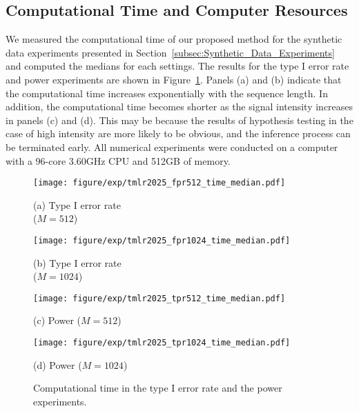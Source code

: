 \subsection{Computational Time and Computer Resources}
\label{Computational_Time}
We measured the computational time of our proposed method for the synthetic data experiments presented in Section~\ref{subsec:Synthetic_Data_Experiments} 
and computed the medians for each settings. 
The results for the type I error rate and power experiments are shown in Figure~\ref{fig_time}. 
Panels (a) and (b) indicate that the computational time increases exponentially with the sequence length. 
In addition, the computational time becomes shorter as the signal intensity increases in panels (c) and (d). 
This may be because the results of hypothesis testing in the case of high intensity are more likely to be obvious, and
the inference process can be terminated early.
All numerical experiments were conducted on a computer with a 96-core 3.60GHz CPU and 512GB of memory.

\begin{figure}[H]
  \centering
  \begin{minipage}[t]{0.24\hsize}
      \centering
      \texttt{[image: figure/exp/tmlr2025\_fpr512\_time\_median.pdf]}
      \captionsetup{justification=centering}
      \caption*{(a) Type I error rate \\ \text{\hspace{1em}} ($M=512$)}
  \end{minipage}
  \hfill
  \begin{minipage}[t]{0.24\hsize}
      \centering
      \texttt{[image: figure/exp/tmlr2025\_fpr1024\_time\_median.pdf]}
      \captionsetup{justification=centering}
      \caption*{(b) Type I error rate \\ \text{\hspace{1em}} ($M=1024$)}
  \end{minipage}
  \begin{minipage}[t]{0.24\hsize}
    \centering
    \texttt{[image: figure/exp/tmlr2025\_tpr512\_time\_median.pdf]}
    \captionsetup{justification=centering}
    \caption*{(c) Power ($M=512$)}
\end{minipage}
\hfill
\begin{minipage}[t]{0.24\hsize}
    \centering
    \texttt{[image: figure/exp/tmlr2025\_tpr1024\_time\_median.pdf]}
    \captionsetup{justification=centering}
    \caption*{(d) Power ($M=1024$)}
\end{minipage}
  \caption{Computational time in the type I error rate and the power experiments.}
  \label{fig_time}
\end{figure}

